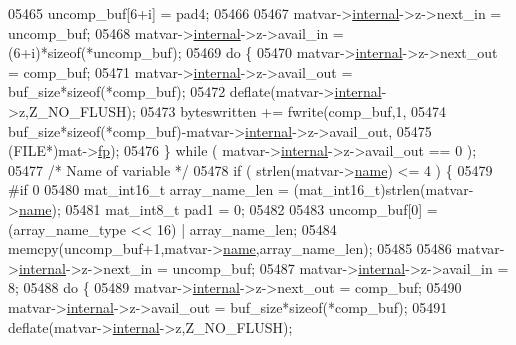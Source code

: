 \begin{DoxyCode}
{{{{{{{{{{{{{{{{{{{{{{{{{{{{{{{{05465             uncomp\_buf[6+i] = pad4;
05466 
05467         matvar->\hyperlink{group___m_a_t_a6e97e3ed9f40c49322c18561c2a94e92}{internal}->z->next\_in  = uncomp\_buf;
05468         matvar->\hyperlink{group___m_a_t_a6e97e3ed9f40c49322c18561c2a94e92}{internal}->z->avail\_in = (6+i)*\textcolor{keyword}{sizeof}(*uncomp\_buf);
05469         \textcolor{keywordflow}{do} \{
05470             matvar->\hyperlink{group___m_a_t_a6e97e3ed9f40c49322c18561c2a94e92}{internal}->z->next\_out  = comp\_buf;
05471             matvar->\hyperlink{group___m_a_t_a6e97e3ed9f40c49322c18561c2a94e92}{internal}->z->avail\_out = buf\_size*\textcolor{keyword}{sizeof}(*comp\_buf);
05472             deflate(matvar->\hyperlink{group___m_a_t_a6e97e3ed9f40c49322c18561c2a94e92}{internal}->z,Z\_NO\_FLUSH);
05473             byteswritten += fwrite(comp\_buf,1,
05474                 buf\_size*\textcolor{keyword}{sizeof}(*comp\_buf)-matvar->\hyperlink{group___m_a_t_a6e97e3ed9f40c49322c18561c2a94e92}{internal}->z->avail\_out,
05475                 (FILE*)mat->\hyperlink{struct__mat__t_a85f562e407ca9ad4d2a6e14f839432b7}{fp});
05476         \} \textcolor{keywordflow}{while} ( matvar->\hyperlink{group___m_a_t_a6e97e3ed9f40c49322c18561c2a94e92}{internal}->z->avail\_out == 0 );
05477         \textcolor{comment}{/* Name of variable */}
05478         \textcolor{keywordflow}{if} ( strlen(matvar->\hyperlink{group___m_a_t_a5d4b55b041e3b4fb50c04337f05ad909}{name}) <= 4 ) \{
05479 \textcolor{preprocessor}{#if 0}
05480             mat\_int16\_t array\_name\_len = (mat\_int16\_t)strlen(matvar->\hyperlink{group___m_a_t_a5d4b55b041e3b4fb50c04337f05ad909}{name});
05481             mat\_int8\_t  pad1 = 0;
05482 
05483             uncomp\_buf[0] = (array\_name\_type << 16) | array\_name\_len;
05484             memcpy(uncomp\_buf+1,matvar->\hyperlink{group___m_a_t_a5d4b55b041e3b4fb50c04337f05ad909}{name},array\_name\_len);
05485 
05486             matvar->\hyperlink{group___m_a_t_a6e97e3ed9f40c49322c18561c2a94e92}{internal}->z->next\_in  = uncomp\_buf;
05487             matvar->\hyperlink{group___m_a_t_a6e97e3ed9f40c49322c18561c2a94e92}{internal}->z->avail\_in = 8;
05488             \textcolor{keywordflow}{do} \{
05489                 matvar->\hyperlink{group___m_a_t_a6e97e3ed9f40c49322c18561c2a94e92}{internal}->z->next\_out  = comp\_buf;
05490                 matvar->\hyperlink{group___m_a_t_a6e97e3ed9f40c49322c18561c2a94e92}{internal}->z->avail\_out = buf\_size*\textcolor{keyword}{sizeof}(*comp\_buf);
05491                 deflate(matvar->\hyperlink{group___m_a_t_a6e97e3ed9f40c49322c18561c2a94e92}{internal}->z,Z\_NO\_FLUSH);
}}}}}}}}}}}}}}}}}}}}}}}}}}}}}}}}
\end{DoxyCode}
